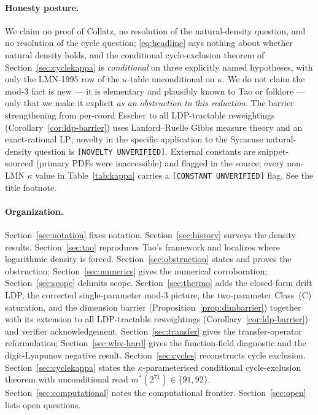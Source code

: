 \documentclass[11pt]{amsart}
\theoremstyle{definition}
\theoremstyle{remark}
\begin{document}
\paragraph{Honesty posture.}
We claim no proof of Collatz, no resolution of the natural-density question, and no resolution
of the cycle question; \eqref{eq:headline} says nothing about whether natural density holds, and
the conditional cycle-exclusion theorem of Section~\ref{sec:cyclekappa} is \emph{conditional} on
three explicitly named hypotheses, with only the LMN-1995 row of the $\kappa$-table unconditional
on $\kappa$. We do not claim the mod-$3$ fact is new --- it is elementary and plausibly known to
Tao or folklore --- only that we make it explicit \emph{as an obstruction to this reduction}.
The barrier strengthening from per-coord Esscher to all LDP-tractable reweightings
(Corollary~\ref{cor:ldp-barrier}) uses Lanford--Ruelle Gibbs measure theory and an exact-rational
LP; novelty in the specific application to the Syracuse natural-density question is
\texttt{[NOVELTY UNVERIFIED]}. External constants are snippet-sourced (primary PDFs were
inaccessible) and flagged in the source; every non-LMN $\kappa$ value in Table~\ref{tab:kappa}
carries a \texttt{[CONSTANT UNVERIFIED]} flag. See the title footnote.

\paragraph{Organization.}
Section~\ref{sec:notation} fixes notation. Section~\ref{sec:history} surveys the density results.
Section~\ref{sec:tao} reproduces Tao's framework and localizes where logarithmic density is forced.
Section~\ref{sec:obstruction} states and proves the obstruction; Section~\ref{sec:numerics} gives the
numerical corroboration; Section~\ref{sec:scope} delimits scope.
Section~\ref{sec:thermo} adds the closed-form drift LDP, the corrected single-parameter mod-$3$
picture, the two-parameter Class~(C) saturation, and the dimension barrier
(Proposition~\ref{prop:dimbarrier}) together with its extension to all LDP-tractable
reweightings (Corollary~\ref{cor:ldp-barrier}) and verifier acknowledgement.
Section~\ref{sec:transfer} gives the transfer-operator reformulation; Section~\ref{sec:why-hard}
gives the function-field diagnostic and the digit-Lyapunov negative result. Section~\ref{sec:cycles}
reconstructs cycle exclusion. Section~\ref{sec:cyclekappa} states the $\kappa$-parameterised
conditional cycle-exclusion theorem with unconditional read $m^*(2^{71})\in\{91,92\}$.
Section~\ref{sec:computational} notes the computational frontier. Section~\ref{sec:open} lists
open questions.
\end{document}

